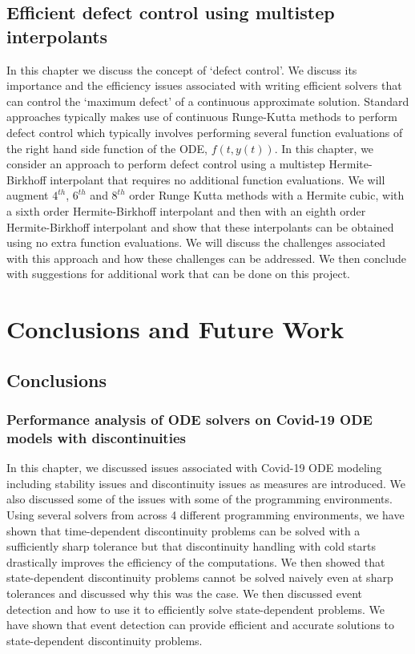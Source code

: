 \documentclass{article}
\begin{document}
\subsection{Efficient defect control using multistep interpolants}
In this chapter we discuss the concept of `defect control'. We discuss its importance and the efficiency issues associated with writing efficient solvers that can control the `maximum defect' of a continuous approximate solution. Standard approaches typically makes use of continuous Runge-Kutta methods to perform defect control which typically involves performing several function evaluations of the right hand side function of the ODE, $f(t, y(t))$. In this chapter, we consider an approach to perform defect control using a multistep Hermite-Birkhoff interpolant that requires no additional function evaluations. We will augment $4^{th}$, $6^{th}$ and $8^{th}$ order Runge Kutta methods with a Hermite cubic, with a sixth order Hermite-Birkhoff interpolant and then with an eighth order Hermite-Birkhoff interpolant and show that these interpolants can be obtained using no extra function evaluations. We will discuss the challenges associated with this approach and how these challenges can be addressed. We then conclude with suggestions for additional work that can be done on this project.

\section{Conclusions and Future Work}
\subsection{Conclusions}
\subsubsection{Performance analysis of ODE solvers on Covid-19 ODE models with discontinuities}
In this chapter, we discussed issues associated with Covid-19 ODE modeling including stability issues and discontinuity issues as measures are introduced. We also discussed some of the issues with some of the programming environments. Using several solvers from across 4 different programming environments, we have shown that time-dependent discontinuity problems can be solved with a sufficiently sharp tolerance but that discontinuity handling with cold starts drastically improves the efficiency of the computations. We then showed that state-dependent discontinuity problems cannot be solved naively even at sharp tolerances and discussed why this was the case. We then discussed event detection and how to use it to efficiently solve state-dependent problems. We have shown that event detection can provide efficient and accurate solutions to state-dependent discontinuity problems.
\end{document}
